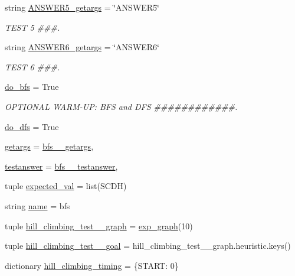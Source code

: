 \begin{DoxyCompactItemize}
string \hyperlink{namespacetests_ad4b24de5f60a3dd05787f03cc9b5c2d9}{A\+N\+S\+W\+E\+R5\+\_\+getargs} = \char`\"{}A\+N\+S\+W\+E\+R5\char`\"{}
\begin{DoxyCompactList}\small\item\em T\+E\+S\+T 5 \#\#\#. \end{DoxyCompactList}\item 
string \hyperlink{namespacetests_a7cf4f66934be710101c8bdb7be6b4aa2}{A\+N\+S\+W\+E\+R6\+\_\+getargs} = \char`\"{}A\+N\+S\+W\+E\+R6\char`\"{}
\begin{DoxyCompactList}\small\item\em T\+E\+S\+T 6 \#\#\#. \end{DoxyCompactList}\item 
\hyperlink{namespacetests_a00808ade50df82ecad4adbfbef73aff3}{do\+\_\+bfs} = True
\begin{DoxyCompactList}\small\item\em O\+P\+T\+I\+O\+N\+A\+L W\+A\+R\+M-\/\+U\+P\+: B\+F\+S and D\+F\+S \#\#\#\#\#\#\#\#\#\#\#\#. \end{DoxyCompactList}\item 
\hyperlink{namespacetests_ae35b4bf9dd1c0354e417f1878c507fc8}{do\+\_\+dfs} = True
\item 
\hyperlink{namespacetests_a146bd4d7c49df2f93661cc5ea208ac41}{getargs} = \hyperlink{namespacetests_aa2f091505206cb051e59b0434fe7aa8d}{bfs\+\_\+\_\+getargs},
\item 
\hyperlink{namespacetests_a22d7b2dd14bb95e8f85cfb851ddad3df}{testanswer} = \hyperlink{namespacetests_a781ee09b8fcf0511a8c99edb509af839}{bfs\+\_\+\_\+testanswer},
\item 
tuple \hyperlink{namespacetests_a199e05e5888c9dc641a251933f4366ef}{expected\+\_\+val} = list(\textquotesingle{}S\+C\+D\+H\textquotesingle{})
\item 
string \hyperlink{namespacetests_a44eb36c9e4890a53d35373eb8836d3a0}{name} = \textquotesingle{}bfs\textquotesingle{}
\item 
tuple \hyperlink{namespacetests_a0edce2ec589dc545f26a7c5182953d0d}{hill\+\_\+climbing\+\_\+test\+\_\+\_\+graph} = \hyperlink{namespacetests_a92e10d86ba4b16c56f82cfb53b87747e}{exp\+\_\+graph}(10)
\item 
tuple \hyperlink{namespacetests_ac7c31605353856f989a374d17e295040}{hill\+\_\+climbing\+\_\+test\+\_\+\_\+goal} = hill\+\_\+climbing\+\_\+test\+\_\+\_\+graph.\+heuristic.\+keys()
\item 
dictionary \hyperlink{namespacetests_a187bd1fb98a53370c815d1db888282e2}{hill\+\_\+climbing\+\_\+timing} = \{\textquotesingle{}S\+T\+A\+R\+T\textquotesingle{}\+: 0\}

\end{DoxyCompactItemize}
